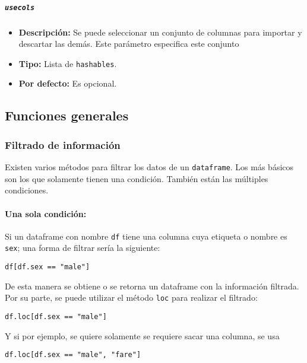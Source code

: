 \subparagraph{\texttt{usecols}}
\begin{itemize}
\item \textbf{Descripción:} Se puede seleccionar un conjunto de columnas para importar y descartar las demás. Este parámetro especifica este conjunto
\item \textbf{Tipo:} Lista de \texttt{hashables}.
\item \textbf{Por defecto:} Es opcional.
\end{itemize}
\subsection{Funciones generales}
\subsubsection{Filtrado de información}
Existen varios métodos para filtrar los datos de un \texttt{dataframe}. Los más básicos son los que solamente tienen una condición. También están las múltiples condiciones. 
\paragraph{Una sola condición:} Si un dataframe con nombre \texttt{df} tiene una columna cuya etiqueta o nombre es \texttt{sex}; una forma de filtrar sería la siguiente:
\begin{verbatim}
df[df.sex == "male"]
\end{verbatim}
De esta manera se obtiene o se retorna un dataframe con la información filtrada.
Por su parte, se puede utilizar el método \texttt{loc} para realizar el filtrado:
\begin{verbatim}
df.loc[df.sex == "male"]    
\end{verbatim}
Y si por ejemplo, se quiere solamente se requiere sacar una columna, se usa
\begin{verbatim}
df.loc[df.sex == "male", "fare"]    
\end{verbatim}
